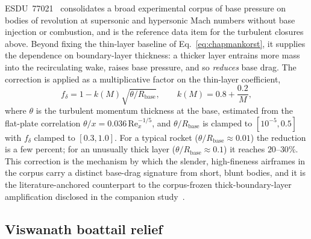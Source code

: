 ESDU~77021~\cite{esdu77021} consolidates a broad experimental corpus of base
pressure on bodies of revolution at supersonic and hypersonic Mach numbers
without base injection or combustion, and is the reference data item for the
turbulent closures above. Beyond fixing the thin-layer baseline of
Eq.~\eqref{eq:chapmankorst}, it supplies the dependence on boundary-layer
thickness: a thicker layer entrains more mass into the recirculating wake, raises
base pressure, and so \emph{reduces} base drag. The correction is applied as a
multiplicative factor on the thin-layer coefficient,
%
\begin{equation}
f_{\delta} = 1 - k(M)\sqrt{\theta/R_{\text{base}}} ,
\qquad k(M) = 0.8 + \frac{0.2}{M} ,
\label{eq:esdu-bl}
\end{equation}
%
where $\theta$ is the turbulent momentum thickness at the base, estimated from the
flat-plate correlation $\theta/x = 0.036\,\mathrm{Re}_{x}^{-1/5}$, and
$\theta/R_{\text{base}}$ is clamped to $[10^{-5}, 0.5]$ with $f_{\delta}$ clamped
to $[0.3, 1.0]$. For a typical rocket ($\theta/R_{\text{base}} \approx 0.01$) the
reduction is a few percent; for an unusually thick layer
($\theta/R_{\text{base}} \approx 0.1$) it reaches $20$--$30\%$. This correction is
the mechanism by which the slender, high-fineness airframes in the corpus carry a
distinct base-drag signature from short, blunt bodies, and it is the
literature-anchored counterpart to the corpus-frozen thick-boundary-layer
amplification disclosed in the companion study~\cite{yu2026jsr}.

\subsection{Viswanath boattail relief}
\label{subsec:viswanath}

